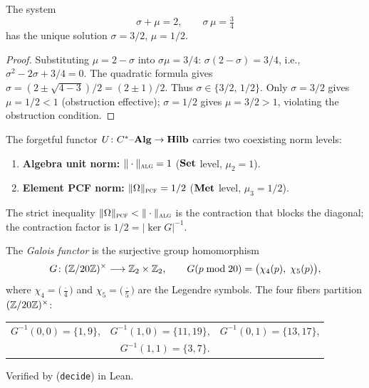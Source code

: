 
\begin{proposition}\label{prop:spectral-uniqueness}
The system
\begin{equation}\label{eq:spectral-system}
  \sigma + \mu = 2, \qquad \sigma\,\mu = \tfrac{3}{4}
\end{equation}
has the unique solution $\sigma = 3/2$, $\mu = 1/2$.
\end{proposition}

\begin{proof}
Substituting $\mu=2-\sigma$ into $\sigma\mu=3/4$:
$\sigma(2-\sigma)=3/4$, i.e., $\sigma^2-2\sigma+3/4=0$.
The quadratic formula gives $\sigma=(2\pm\sqrt{4-3})/2=(2\pm 1)/2$.
Thus $\sigma\in\{3/2,\,1/2\}$.  Only $\sigma=3/2$ gives
$\mu=1/2<1$ (obstruction effective); $\sigma=1/2$ gives $\mu=3/2>1$,
violating the obstruction condition.
\end{proof}


\begin{definition}\label{def:two-level-norms}
The forgetful functor $U\colon C^*\text{--}\mathbf{Alg}\to\mathbf{Hilb}$ carries two coexisting norm levels:
\begin{enumerate}[label=\alph*), leftmargin=2em]
  \item \textbf{Algebra unit norm:} $\|\cdot\|_{\text{\textsc{alg}}} = 1$ ($\mathbf{Set}$ level, $\mu_2 = 1$).
  \item \textbf{Element PCF norm:} $\|\Omega\|_{\text{\textsc{pcf}}} = 1/2$ ($\mathbf{Met}$ level, $\mu_3 = 1/2$).
\end{enumerate}
The strict inequality $\|\Omega\|_{\text{\textsc{pcf}}} < \|\cdot\|_{\text{\textsc{alg}}}$ is the contraction that blocks the diagonal; the contraction factor is $1/2 = |\ker G|^{-1}$.
\end{definition}


\begin{definition}\label{def:galois-functor}
The \emph{Galois functor} is the surjective group homomorphism
\begin{equation}\label{eq:galois-functor}
  G\colon(\mathbb{Z}/20\mathbb{Z})^\times\longrightarrow\mathbb{Z}_2\times\mathbb{Z}_2,
  \qquad
  G(p\bmod 20) =
  \bigl(\chi_4(p),\;\chi_5(p)\bigr),
\end{equation}
where $\chi_4 = \bigl(\frac{\cdot}{4}\bigr)$ and
$\chi_5 = \bigl(\frac{\cdot}{5}\bigr)$ are the Legendre symbols.
The four fibers partition $(\mathbb{Z}/20\mathbb{Z})^\times$:
\begin{center}
\begin{tabular}{ccl}
  $G^{-1}(0,0)=\{1,9\}$, &\quad
  $G^{-1}(1,0)=\{11,19\}$, &\quad
  $G^{-1}(0,1)=\{13,17\}$, \\[3pt]
  \multicolumn{3}{c}{$G^{-1}(1,1)=\{3,7\}$.}
\end{tabular}
\end{center}
Verified by  (\texttt{decide}) in Lean.
\end{definition}

